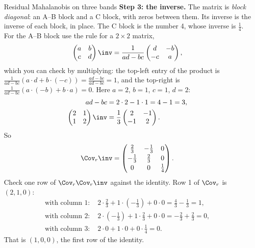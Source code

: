 \begin{worked}[label={we:residualmaha:three}]{Residual Mahalanobis on three bands}
\textbf{Step 3: the inverse.} The matrix is \emph{block diagonal}: an A--B block and a C block, with zeros
between them. Its inverse is the inverse of each block, in place. The C block is the number 4, whose inverse
is $\tfrac14$. For the A--B block use the rule for a $2\times2$ matrix,
\begin{equation}
\begin{pmatrix}a&b\\c&d\end{pmatrix}\inv=\frac{1}{ad-bc}\begin{pmatrix}d&-b\\-c&a\end{pmatrix},
\label{eq:residualmaha:inv2}
\end{equation}
which you can check by multiplying: the top-left entry of the product is
$\frac{1}{ad-bc}(a\cdot d+b\cdot(-c))=\frac{ad-bc}{ad-bc}=1$, and the top-right is
$\frac{1}{ad-bc}(a\cdot(-b)+b\cdot a)=0$. Here $a=2$, $b=1$, $c=1$, $d=2$:
\begin{align*}
ad-bc &= 2\cdot2-1\cdot1 = 4-1 = 3,\\
\begin{pmatrix}2&1\\1&2\end{pmatrix}\inv &= \frac13\begin{pmatrix}2&-1\\-1&2\end{pmatrix}.
\end{align*}
So
\[
\Cov_r\inv=\begin{pmatrix}\tfrac23&-\tfrac13&0\\[2pt]-\tfrac13&\tfrac23&0\\[2pt]0&0&\tfrac14\end{pmatrix}.
\]
Check one row of $\Cov_r\Cov_r\inv$ against the identity. Row 1 of $\Cov_r$ is $(2,1,0)$:
\begin{align*}
\text{with column 1: } & 2\cdot\tfrac23+1\cdot(-\tfrac13)+0\cdot0 = \tfrac43-\tfrac13 = 1,\\
\text{with column 2: } & 2\cdot(-\tfrac13)+1\cdot\tfrac23+0\cdot0 = -\tfrac23+\tfrac23 = 0,\\
\text{with column 3: } & 2\cdot0+1\cdot0+0\cdot\tfrac14 = 0.
\end{align*}
That is $(1,0,0)$, the first row of the identity.


\end{worked}
